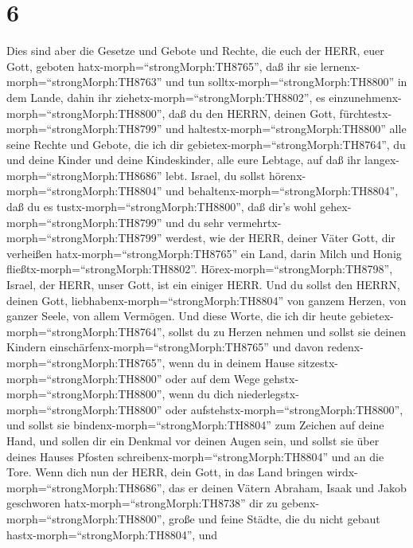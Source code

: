\hypertarget{section-5}{%
\section{6}\label{section-5}}

 Dies sind aber die Gesetze und Gebote und Rechte, die euch
der HERR, euer Gott, geboten hatx-morph=``strongMorph:TH8765'', daß ihr
sie lernenx-morph=``strongMorph:TH8763'' und tun
solltx-morph=``strongMorph:TH8800'' in dem Lande, dahin ihr
ziehetx-morph=``strongMorph:TH8802'', es
einzunehmenx-morph=``strongMorph:TH8800'',  daß du den
HERRN, deinen Gott, fürchtestx-morph=``strongMorph:TH8799'' und
haltestx-morph=``strongMorph:TH8800'' alle seine Rechte und Gebote, die
ich dir gebietex-morph=``strongMorph:TH8764'', du und deine Kinder und
deine Kindeskinder, alle eure Lebtage, auf daß ihr
langex-morph=``strongMorph:TH8686'' lebt.  Israel, du sollst
hörenx-morph=``strongMorph:TH8804'' und
behaltenx-morph=``strongMorph:TH8804'', daß du es
tustx-morph=``strongMorph:TH8800'', daß dir's wohl
gehex-morph=``strongMorph:TH8799'' und du sehr
vermehrtx-morph=``strongMorph:TH8799'' werdest, wie der HERR, deiner
Väter Gott, dir verheißen hatx-morph=``strongMorph:TH8765'' ein Land,
darin Milch und Honig fließtx-morph=``strongMorph:TH8802''. 
Hörex-morph=``strongMorph:TH8798'', Israel, der HERR, unser Gott, ist
ein einiger HERR.  Und du sollst den HERRN, deinen Gott,
liebhabenx-morph=``strongMorph:TH8804'' von ganzem Herzen, von ganzer
Seele, von allem Vermögen.  Und diese Worte, die ich dir
heute gebietex-morph=``strongMorph:TH8764'', sollst du zu Herzen nehmen
 und sollst sie deinen Kindern
einschärfenx-morph=``strongMorph:TH8765'' und davon
redenx-morph=``strongMorph:TH8765'', wenn du in deinem Hause
sitzestx-morph=``strongMorph:TH8800'' oder auf dem Wege
gehstx-morph=``strongMorph:TH8800'', wenn du dich
niederlegstx-morph=``strongMorph:TH8800'' oder
aufstehstx-morph=``strongMorph:TH8800'',  und sollst sie
bindenx-morph=``strongMorph:TH8804'' zum Zeichen auf deine Hand, und
sollen dir ein Denkmal vor deinen Augen sein,  und sollst
sie über deines Hauses Pfosten schreibenx-morph=``strongMorph:TH8804''
und an die Tore.  Wenn dich nun der HERR, dein Gott, in das
Land bringen wirdx-morph=``strongMorph:TH8686'', das er deinen Vätern
Abraham, Isaak und Jakob geschworen hatx-morph=``strongMorph:TH8738''
dir zu gebenx-morph=``strongMorph:TH8800'', große und feine Städte, die
du nicht gebaut hastx-morph=``strongMorph:TH8804'',  und
